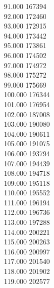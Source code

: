 { 91.000	167394 \\
 92.000	172460 \\
 93.000	172915 \\
 94.000	173442 \\
 95.000	173861 \\
 96.000	174502 \\
 97.000	174972 \\
 98.000	175272 \\
 99.000	175669 \\
 100.000	176344 \\
 101.000	176954 \\
 102.000	187008 \\
 103.000	190080 \\
 104.000	190611 \\
 105.000	191075 \\
 106.000	193794 \\
 107.000	194439 \\
 108.000	194718 \\
 109.000	195118 \\
 110.000	195552 \\
 111.000	196194 \\
 112.000	196736 \\
 113.000	197288 \\
 114.000	200221 \\
 115.000	200263 \\
 116.000	200997 \\
 117.000	201540 \\
 118.000	201902 \\
 119.000	202577 \\
}

